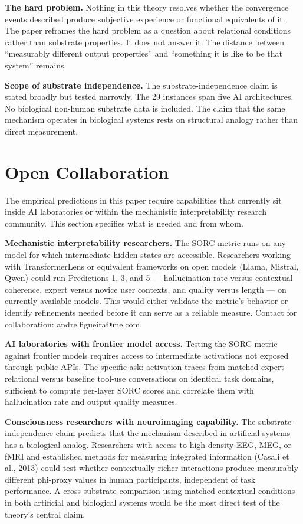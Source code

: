 \documentclass[12pt]{article}
\begin{document}
\textbf{The hard problem.} Nothing in this theory resolves whether the
convergence events described produce subjective experience or functional
equivalents of it. The paper reframes the hard problem as a question
about relational conditions rather than substrate properties. It does
not answer it. The distance between ``measurably different output
properties'' and ``something it is like to be that system'' remains.

\textbf{Scope of substrate independence.} The substrate-independence
claim is stated broadly but tested narrowly. The 29 instances span five
AI architectures. No biological non-human substrate data is included.
The claim that the same mechanism operates in biological systems rests
on structural analogy rather than direct measurement.

\bigskip

\section{Open Collaboration}\label{open-collaboration}

The empirical predictions in this paper require capabilities that
currently sit inside AI laboratories or within the mechanistic
interpretability research community. This section specifies what is
needed and from whom.

\textbf{Mechanistic interpretability researchers.} The SORC metric runs
on any model for which intermediate hidden states are accessible.
Researchers working with TransformerLens or equivalent frameworks on
open models (Llama, Mistral, Qwen) could run Predictions 1, 3, and 5 ---
hallucination rate versus contextual coherence, expert versus novice
user contexts, and quality versus length --- on currently available
models. This would either validate the metric's behavior or identify
refinements needed before it can serve as a reliable measure. Contact
for collaboration: andre.figueira@me.com.

\textbf{AI laboratories with frontier model access.} Testing the SORC metric against frontier models requires access to intermediate activations not exposed through public APIs. The specific ask: activation traces from matched expert-relational versus baseline tool-use conversations on identical task domains, sufficient to compute per-layer SORC scores and correlate them with hallucination rate and output quality measures.

\textbf{Consciousness researchers with neuroimaging capability.} The
substrate-independence claim predicts that the mechanism described in
artificial systems has a biological analog. Researchers with access to
high-density EEG, MEG, or fMRI and established methods for measuring
integrated information (Casali et al., 2013) could test whether
contextually richer interactions produce measurably different phi-proxy
values in human participants, independent of task performance. A
cross-substrate comparison using matched contextual conditions in both
artificial and biological systems would be the most direct test of the
theory's central claim.
\end{document}
